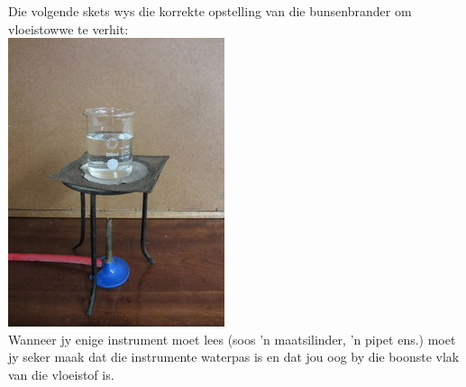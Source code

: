 Die volgende skets wys die korrekte opstelling van die bunsenbrander om vloeistowwe te verhit:\\
\includegraphics[width=.3\textwidth]{photos/beaker_tripod.jpg}\\
Wanneer jy enige instrument moet lees (soos  'n maatsilinder,  'n pipet ens.) moet jy seker maak dat die instrumente waterpas is en dat jou oog by die boonste vlak van die vloeistof is.

